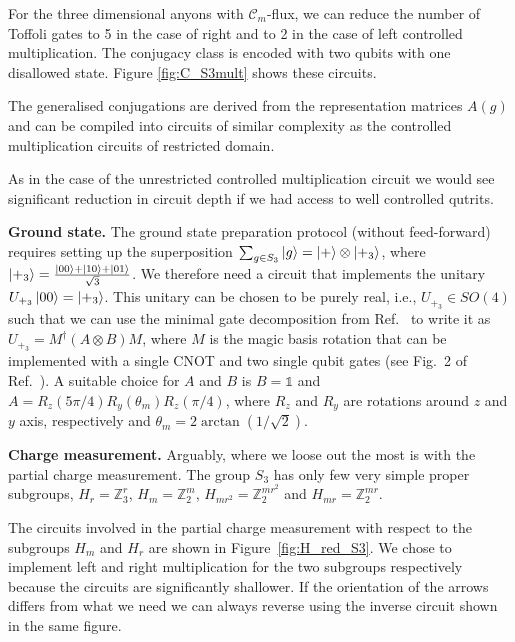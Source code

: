 \documentclass[a4paper,twocolumn,11pt]{quantumarticle}
\begin{document}
For the three dimensional anyons with $\mathcal{C}_m$-flux, we can reduce the number of Toffoli gates to 5 in the case of right and to 2 in the case of left controlled multiplication. The conjugacy class is encoded with two qubits with one disallowed state. Figure \ref{fig:C_S3mult} shows these circuits.

The generalised conjugations are derived from the representation matrices $A{(g)}$ and can be compiled into circuits of similar complexity as the controlled multiplication circuits of restricted domain.

As in the case of the unrestricted controlled multiplication circuit we would see significant reduction in circuit depth if we had access to well controlled qutrits.

\textbf{Ground state.}
The ground state preparation protocol (without feed-forward) requires setting up the superposition $\sum_{g \in S_3} \ket{g}=\ket{+}\otimes \ket{+_3}$, where $\ket{+_3}=\frac{\ket{00}+\ket{10}+\ket{01}}{{\sqrt{3}} }$. We therefore need a circuit that implements the unitary $U_{+_3}\ket{00}= \ket{+_3}$. This unitary can be chosen to be purely real, i.e., $U_{+_3}\in SO(4)$ such that we can use the minimal gate decomposition from Ref.~\cite{decomp} to write it as $U_{+_3}=M^\dag(A\otimes B)M$, where $M$ is the magic basis rotation that can be implemented with a single CNOT and two single qubit gates  (see Fig.~2 of Ref.~\cite{decomp}). A suitable choice for $A$ and $B$ is $B=\mathbb 1$ and $A=R_z(5\pi/4)R_y(\theta_m) R_z(\pi/4)$, where $R_z$ and $R_y$ are rotations around $z$ and $y$ axis, respectively and $\theta_m=2 \arctan(1/\sqrt{2})$. 

\textbf{Charge measurement.}
Arguably, where we loose out the most is with the partial charge measurement. The group $S_3$ has only few very simple proper subgroups, $H_r = \mathbb{Z}_3^r$, $H_m = \mathbb{Z}_2^m$, $H_{mr^2} = \mathbb{Z}_2^{mr^2}$ and $H_{mr} = \mathbb{Z}_2^{mr}$.

The circuits involved in the partial charge measurement with respect to the subgroups $H_m$ and $H_r$ are shown in Figure~\ref{fig:H_red_S3}. We chose to implement left and right multiplication for the two subgroups respectively because the circuits are significantly shallower. If the orientation of the arrows differs from what we need we can always reverse using the inverse circuit shown in the same figure.
\end{document}
